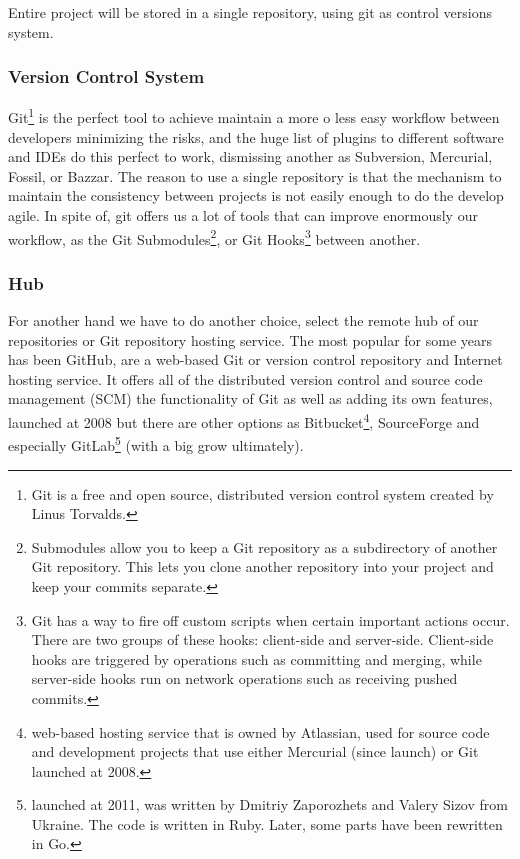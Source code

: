 Entire project will be stored in a single repository, using git as control
versions system.

\subsubsection{Version Control System}

Git\footnote{Git is a free and open source, distributed version control system
created by Linus Torvalds.} is the perfect tool to achieve maintain a more o
less easy workflow between developers minimizing the risks, and the huge list of
plugins to different software and IDEs do this perfect to work, dismissing another
as Subversion, Mercurial, Fossil, or Bazzar.
\intro
The reason to use a single repository is that the mechanism to maintain the
consistency between projects is not easily enough to do the develop agile.
In spite of, git offers us a lot of tools that can improve enormously our
workflow, as the Git Submodules\footnote{Submodules allow you to keep a
Git repository as a subdirectory of another Git repository.
This lets you clone another repository into your project and keep your commits
separate.}, or Git Hooks\footnote{Git has a way to fire off custom scripts when
certain important actions occur. There are two groups of these hooks:
client-side and server-side. Client-side hooks are triggered by operations such
as committing and merging, while server-side hooks run on network operations
such as receiving pushed commits.} between another.

\subsubsection{Hub}

For another hand we have to do another choice, select the remote hub of our repositories
or Git repository hosting service. The most popular for some years has been GitHub,
are a web-based Git or version control repository and Internet hosting service.
It offers all of the distributed version control and source code management (SCM)
the functionality of Git as well as adding its own features,
launched at 2008
but there are other options as Bitbucket\footnote{web-based hosting service
that is owned by Atlassian, used for source code and development projects that
use either Mercurial (since launch) or Git
launched at 2008.},
SourceForge and especially
GitLab\footnote{launched at 2011, was written by Dmitriy Zaporozhets and Valery
Sizov from Ukraine. The code is written in Ruby. Later, some parts have been
rewritten in Go.} (with a big grow ultimately). \pagebreak


